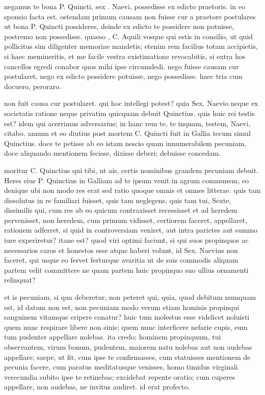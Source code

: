  negamus te bona P. Quincti, sex . Naevi, possedisse ex edicto praetoris. in eo sponsio facta est. ostendam primum causam non fuisse cur a praetore postulares ut bona P. Quincti possideres, deinde ex edicto te possidere non potuisse, postremo non possedisse. quaeso , C. Aquili vosque qui estis in consilio, ut quid pollicitus sim diligenter memoriae mandetis; etenim rem facilius totam accipietis, si haec memineritis, et me facile vestra existimatione revocabitis, si extra hos cancellos egredi conabor quos mihi ipse circumdedi. nego fuisse causam cur postularet, nego ex edicto possidere potuisse, nego possedisse. haec tria cum docuero, peroraro.

 non fuit causa cur postularet. qui hoc intellegi potest? quia Sex. Naevio neque ex societatis ratione neque privatim quicquam debuit Quinctius. quis huic rei testis est? idem qui acerrimus adversarius; in hanc rem te, te inquam, testem, Naevi, citabo. annum et eo diutius post mortem C. Quincti fuit in Gallia tecum simul Quinctius. doce te petisse ab eo istam nescio quam innumerabilem pecuniam, doce aliquando mentionem fecisse, dixisse deberi; debuisse concedam.

 moritur C. Quinctius qui tibi, ut ais, certis nominibus grandem pecuniam debuit. Heres eius P. Quinctius in Galliam ad te ipsum venit in agrum communem, eo denique ubi non modo res erat sed ratio quoque omnis et omnes litterae. quis tam dissolutus in re familiari fuisset, quis tam neglegens, quis tam tui, Sexte, dissimilis qui, cum res ab eo quicum contraxisset recessisset et ad heredem pervenisset, non heredem, cum primum vidisset, certiorem faceret, appellaret, rationem adferret, si quid in controversiam veniret, aut intra parietes aut summo iure experiretur? itane est? quod viri optimi faciunt, si qui suos propinquos ac necessarios caros et honestos esse atque haberi volunt, id Sex. Naevius non faceret, qui usque eo fervet ferturque avaritia ut de suis commodis aliquam partem velit committere ne quam partem huic propinquo suo ullius ornamenti relinquat?

 et is pecuniam, si qua deberetur, non peteret qui, quia, quod debitum numquam est, id datum non est, non pecuniam modo verum etiam hominis propinqui sanguinem vitamque eripere conatur? huic tum molestus esse videlicet noluisti quem nunc respirare libere non sinis; quem nunc interficere nefarie cupis, eum tum pudenter appellare nolebas. ita credo; hominem propinquum, tui observantem, virum bonum, pudentem, maiorem natu nolebas aut non audebas appellare; saepe, ut fit, cum ipse te confirmasses, cum statuisses mentionem de pecunia facere, cum paratus meditatusque venisses, homo timidus virginali verecundia subito ipse te retinebas; excidebat repente oratio; cum cuperes appellare, non audebas, ne invitus audiret. id erat profecto.

